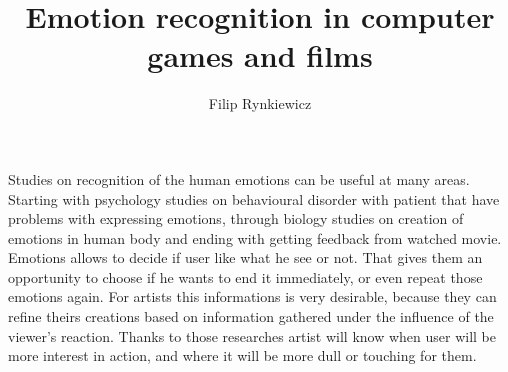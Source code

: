 \documentclass[10pt,journal,compsoc,twoside]{IEEEtran}
\begin{document}
\title{Emotion recognition in computer games and films}

\author{Filip Rynkiewicz%
}


%
{}


\maketitle
\IEEEdisplaynontitleabstractindextext
\IEEEpeerreviewmaketitle
{}
Studies on recognition of the human emotions can be useful at many areas. Starting with psychology studies on behavioural disorder with patient that have problems with expressing emotions, through biology studies on creation of emotions in human body and ending with getting feedback from watched movie. Emotions allows to decide if user like what he see or not. That gives them an opportunity to choose if he wants to end it immediately, or even repeat those emotions again. For artists this informations is very desirable, because they can refine theirs creations based on information gathered under the influence of the viewer's reaction. Thanks to those researches artist will know when user will be more interest in action, and where it will be more dull or touching for them. 
\end{document}
